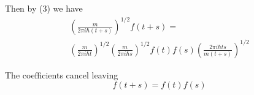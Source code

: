 \documentclass[12pt]{article}
\begin{document}
\noindent
Then by (3) we have
\begin{multline*}
\left(\frac{m}{2\pi i\hbar(t+s)}\right)^{1/2}
f(t+s)=
\\
\left(\frac{m}{2\pi i\hbar t}\right)^{1/2}
\left(\frac{m}{2\pi i\hbar s}\right)^{1/2}
f(t)f(s)
\left(\frac{2\pi i\hbar ts}{m(t+s)}\right)^{1/2}
\end{multline*}

\noindent
The coefficients cancel leaving
\begin{equation*}
f(t+s)=f(t)f(s)
\end{equation*}
\end{document}
